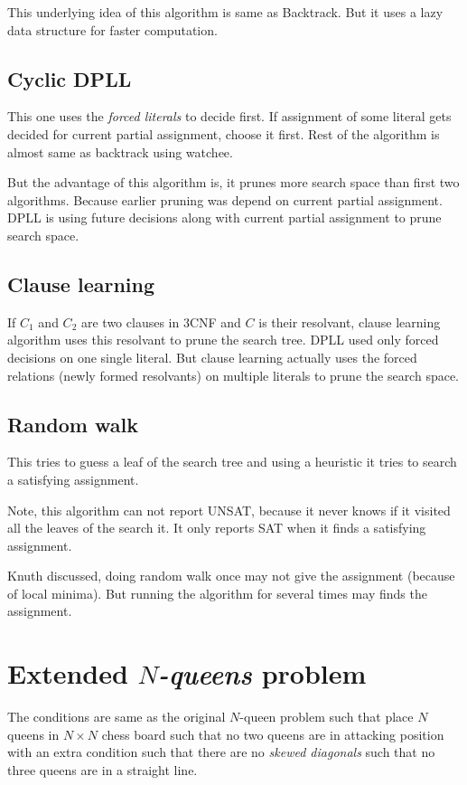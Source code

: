 \documentclass[a4paper]{article}
\begin{document}
This underlying idea of this algorithm is same as Backtrack. But it uses a lazy data structure for faster computation.

\subsection{Cyclic DPLL}

This one uses the \emph{forced literals} to decide first. If assignment of some literal gets decided for current partial assignment, choose it first. Rest of the algorithm is almost same as backtrack using watchee.

But the advantage of this algorithm is, it prunes more search space than first two algorithms. Because earlier pruning was depend on current partial assignment. DPLL is using future decisions along with current partial assignment to prune search space.

\subsection{Clause learning}

If $C_1$ and $C_2$ are two clauses in 3CNF and $C$ is their resolvant, clause learning algorithm uses this resolvant to prune the search tree. DPLL used only forced decisions on one single literal. But clause learning actually uses the forced relations (newly formed resolvants) on multiple literals to prune the search space.

\subsection{Random walk}

This tries to guess a leaf of the search tree and using a heuristic it tries to search a satisfying assignment.

Note, this algorithm can not report UNSAT, because it never knows if it visited all the leaves of the search it. It only reports SAT when it finds a satisfying assignment.

Knuth discussed, doing random walk once may not give the assignment (because of local minima). But running the algorithm for several times may finds the assignment.

\section{Extended \emph{$N$-queens} problem}

The conditions are same as the original $N$-queen problem such that place $N$ queens in $N \times N$ chess board such that no two queens are in attacking position with an extra condition such that there are no \emph{skewed diagonals} such that no three queens are in a straight line.
\end{document}
